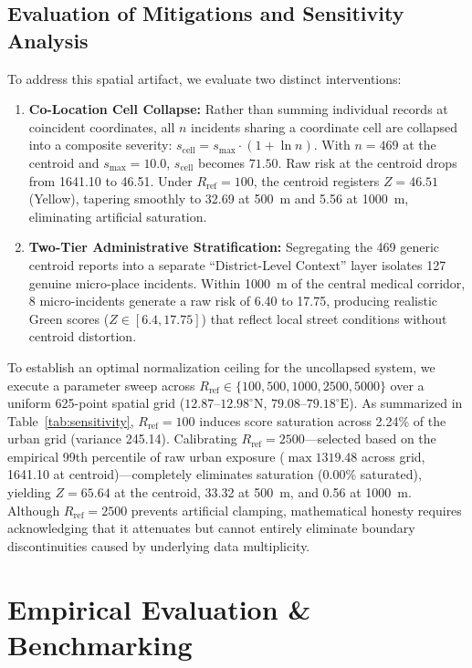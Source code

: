 \documentclass[conference]{IEEEtran}
\begin{document}
\subsection{Evaluation of Mitigations and Sensitivity Analysis}
To address this spatial artifact, we evaluate two distinct interventions:
\begin{enumerate}
    \item \textbf{Co-Location Cell Collapse:} Rather than summing individual records at coincident coordinates, all $n$ incidents sharing a coordinate cell are collapsed into a composite severity: $s_{\text{cell}} = s_{\text{max}} \cdot (1 + \ln n)$. With $n = 469$ at the centroid and $s_{\text{max}} = 10.0$, $s_{\text{cell}}$ becomes $71.50$. Raw risk at the centroid drops from 1641.10 to 46.51. Under $R_{\text{ref}} = 100$, the centroid registers $Z = 46.51$ (Yellow), tapering smoothly to 32.69 at 500~m and 5.56 at 1000~m, eliminating artificial saturation.
    \item \textbf{Two-Tier Administrative Stratification:} Segregating the 469 generic centroid reports into a separate ``District-Level Context'' layer isolates 127 genuine micro-place incidents. Within 1000~m of the central medical corridor, 8 micro-incidents generate a raw risk of 6.40 to 17.75, producing realistic Green scores ($Z \in [6.4, 17.75]$) that reflect local street conditions without centroid distortion.
\end{enumerate}

To establish an optimal normalization ceiling for the uncollapsed system, we execute a parameter sweep across $R_{\text{ref}} \in \{100, 500, 1000, 2500, 5000\}$ over a uniform 625-point spatial grid ($12.87\text{--}12.98^\circ\text{N}$, $79.08\text{--}79.18^\circ\text{E}$). As summarized in Table~\ref{tab:sensitivity}, $R_{\text{ref}} = 100$ induces score saturation across 2.24\% of the urban grid (variance 245.14). Calibrating $R_{\text{ref}} = 2500$---selected based on the empirical 99th percentile of raw urban exposure ($\max 1319.48$ across grid, 1641.10 at centroid)---completely eliminates saturation (0.00\% saturated), yielding $Z = 65.64$ at the centroid, 33.32 at 500~m, and 0.56 at 1000~m. Although $R_{\text{ref}} = 2500$ prevents artificial clamping, mathematical honesty requires acknowledging that it attenuates but cannot entirely eliminate boundary discontinuities caused by underlying data multiplicity.

\section{Empirical Evaluation \& Benchmarking}
\end{document}
